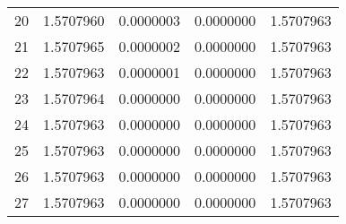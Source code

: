 \documentclass[a4paper]{scrartcl}
\begin{document}
\begin{aufgabe}
\begin{enumerate}[a)]
\begin{table}[h]
\begin{tabular}{c|c|c|c|c}
20 & 1.5707960 & 0.0000003 & 0.0000000 & 1.5707963\\
21 & 1.5707965 & 0.0000002 & 0.0000000 & 1.5707963\\
22 & 1.5707963 & 0.0000001 & 0.0000000 & 1.5707963\\
23 & 1.5707964 & 0.0000000 & 0.0000000 & 1.5707963\\
24 & 1.5707963 & 0.0000000 & 0.0000000 & 1.5707963\\
25 & 1.5707963 & 0.0000000 & 0.0000000 & 1.5707963\\
26 & 1.5707963 & 0.0000000 & 0.0000000 & 1.5707963\\
27 & 1.5707963 & 0.0000000 & 0.0000000 & 1.5707963\\
				\end{tabular}
			\end{table}
	\end{enumerate}
\end{aufgabe}
\end{document}
